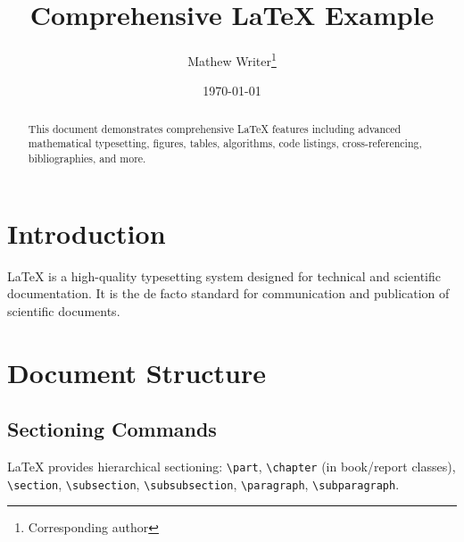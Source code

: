 \documentclass{article}
\title{Comprehensive \LaTeX{} Example}
\author{Mathew Writer\thanks{Corresponding author}}
\date{\today}
\begin{document}
\maketitle

\begin{abstract}
This document demonstrates comprehensive \LaTeX{} features including advanced mathematical typesetting, figures, tables, algorithms, code listings, cross-referencing, bibliographies, and more.
\end{abstract}

\tableofcontents
\newpage

\section{Introduction}
\LaTeX{} is a high-quality typesetting system designed for technical and scientific documentation. It is the de facto standard for communication and publication of scientific documents.

\section{Document Structure}
\subsection{Sectioning Commands}
\LaTeX{} provides hierarchical sectioning: \verb|\part|, \verb|\chapter| (in book/report classes), \verb|\section|, \verb|\subsection|, \verb|\subsubsection|, \verb|\paragraph|, \verb|\subparagraph|.
\end{document}
